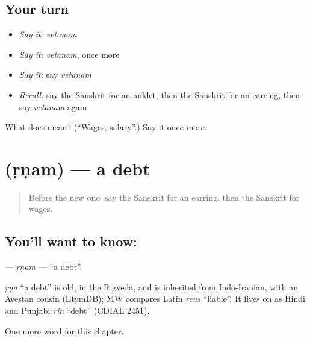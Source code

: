 \subsection*{Your turn}
\begin{itemize}
\raggedright
  \item \emph{Say it:} \emph{vetanam}
  \item \emph{Say it:} \emph{vetanam}, once more
  \item \emph{Say it:} say \emph{vetanam}
  \item \emph{Recall:} say the Sanskrit for an anklet, then the Sanskrit for an earring, then say \emph{vetanam} again
\end{itemize}

\begin{tcolorbox}[breakable,colback=teal!4,colframe=teal!35!black,title={Before you move on}]
What does  mean? (\textquotedblleft{}Wages, salary\textquotedblright{}.) Say it once more.
\end{tcolorbox}
\section[\texorpdfstring{\sk{ऋणम्} (ṛṇam)}{ऋणम् (ṛṇam)}]{ (ṛṇam) — a debt}

\label{lesson:SA-C162-rnam}



\begin{quote}
Before the new one: say the Sanskrit for an earring, then the Sanskrit for wages.
\end{quote}

\subsection*{You'll want to know: }
\textbf{} — \emph{ṛṇam} — \textquotedblleft{}a debt\textquotedblright{}.

\begin{cousinweb}
\emph{ṛṇa} \textquotedblleft{}a debt\textquotedblright{} is old, in the Rigveda, and is inherited from Indo-Iranian, with an Avestan cousin (EtymDB); MW compares Latin \emph{reus} \textquotedblleft{}liable\textquotedblright{}. It lives on as Hindi and Punjabi \emph{rin} \textquotedblleft{}debt\textquotedblright{} (CDIAL 2451).
\end{cousinweb}

\begin{grammarlens}[title={What you've built}]
One more word for this chapter.
\end{grammarlens}

